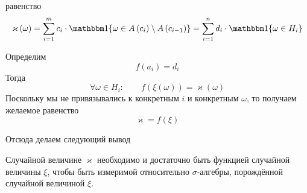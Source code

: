 равенство
\begin{equation*}
  \varkappa\left( \omega \right)
  = \sum_{i=1}^m c_i \cdot \Indicator{\omega
      \in A\left( c_{i} \right) \setminus A\left( c_{i-1} \right)}
  = \sum_{i=1}^n d_i \cdot \Indicator{\omega \in H_i}
\end{equation*}
\begin{comment}
Видим, что теперь можно определить отображение из множества значений,
принимаемых случайной величиной $\xi$, в множество значений,
принимаемых случайной величиной $\varkappa$

$$f: \left\{ a_1, a_2, \dots, a_n \right\}
  \rightarrow \left\{ d_1, d_2, \dots, d_n \right\}$$

Попробуем показать, что $\varkappa$ является функцией от $\xi$.
Очевидно, что случайная величина $\xi$ имеет такой же вид,
что и $\varkappa$ --- сумма констант, умноженных на индикаторы,
так как мы только что показали, что все функции,
измеримые относительно $\sigma$-алгебры, порождённой случайной величиной $\xi$,
выглядят именно так
$$f\left( \xi\left( \omega \right) \right)
  = f\left( \sum_{i=1}^n a_i \cdot \Indicator{\omega \in H_i} \right)$$

Поскольку уровни $H_i$ не пересекаются,
то лишь одно слагаемое не будет равно нулю:
$\omega$ может принадлежать лишь одному уровню.
В таком случае запись принимает свой изначальный вид без суммы
\eqref{randomVariableFirst}
$$f\left( \xi\left( \omega \right) \right)
  = f\left( a_i \right),\; \omega \in H_i$$

Замечаем, что $f\left( a_i \right) = d_i$, а это и есть то значение,
которое принимает случайная величина $\varkappa$ на уровне $H_i$
$$f\left( \xi\left( \omega \right) \right)
  = f\left( a_i \right) = d_i
  = \varkappa\left( \omega \right),\; \omega \in H_i$$
\end{comment}
Определим
\begin{equation*}
  f\left( a_i \right) = d_i
\end{equation*}
Тогда
\begin{equation*}
  \forall \omega \in H_i:\qquad
  f\left( \xi\left( \omega \right) \right)
  = \varkappa\left( \omega \right)
\end{equation*}
Поскольку мы не привязывались к конкретным $i$ и конкретным $\omega$,
то получаем желаемое равенство
\begin{equation*}
  \varkappa = f\left( \xi \right)
\end{equation*}

Отсюда делаем следующий вывод
\begin{affirmation}\label{measurableRandomVariable}
  Случайной величине $\varkappa$
  необходимо и достаточно быть функцией случайной величины $\xi$,
  чтобы быть измеримой относительно $\sigma$-алгебры,
  порождённой случайной величиной $\xi$.
\end{affirmation}

